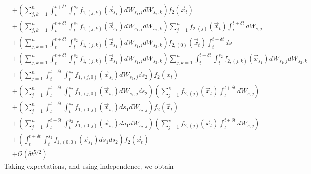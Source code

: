\documentclass[12pt]{article}
\begin{document}
\begin{equation}
\begin{aligned}
&+\left( \sum_{j, k=1}^n \int_t^{t+\delta t} \int_t^{s_2} f_{1,(j,k)}(\vec{x}_{s_1}) dW_{s_1, j} dW_{s_2, k} \right) f_2(\vec{x}_t) \\
&+  \left( \sum_{j, k=1}^n \int_t^{t+\delta t} \int_t^{s_2} f_{1,(j,k)}(\vec{x}_{s_1}) dW_{s_1, j} dW_{s_2, k} \right) \sum_{j=1}^n f_{2,(j)}(\vec{x}_t) \int_t^{t + \delta t} dW_{s,j} \\
&+ \left( \sum_{j, k=1}^n \int_t^{t+\delta t} \int_t^{s_2} f_{1,(j,k)}(\vec{x}_{s_1}) dW_{s_1, j} dW_{s_2, k} \right) f_{2,(0)}(\vec{x}_t) \int_t^{t + \delta t} ds \\
&+ \left( \sum_{j, k=1}^n \int_t^{t+\delta t} \int_t^{s_2} f_{1,(j,k)}(\vec{x}_{s_1}) dW_{s_1, j} dW_{s_2, k} \right)\sum_{j, k=1}^n \int_t^{t+\delta t} \int_t^{s_2} f_{2,(j,k)}(\vec{x}_{s_1}) dW_{s_1, j} dW_{s_2, k} \\
&+ \left( \sum_{j=1}^n \int_t^{t+\delta t} \int_t^{s_2} f_{1,(j,0)}(\vec{x}_{s_1}) dW_{s_1, j} ds_2  \right) f_2(\vec{x}_t) \\
&+  \left( \sum_{j=1}^n \int_t^{t+\delta t} \int_t^{s_2} f_{1,(j,0)}(\vec{x}_{s_1}) dW_{s_1, j} ds_2  \right)\left( \sum_{j=1}^n f_{2,(j)}(\vec{x}_t) \int_t^{t + \delta t} dW_{s,j} \right)\\
&+ \left( \sum_{j=1}^n \int_t^{t+\delta t} \int_t^{s_2} f_{1,(0,j)}(\vec{x}_{s_1}) ds_1 dW_{s_2, j}  \right) f_2(\vec{x}_t) \\
&+  \left( \sum_{j=1}^n \int_t^{t+\delta t} \int_t^{s_2} f_{1,(0,j)}(\vec{x}_{s_1}) ds_1 dW_{s_2, j}  \right)\left( \sum_{j=1}^n f_{2,(j)}(\vec{x}_t) \int_t^{t + \delta t} dW_{s,j} \right) \\
&+ \left( \int_t^{t+\delta t} \int_t^{s_2} f_{1,(0,0)}(\vec{x}_{s_1}) ds_1 ds_2 \right) f_2(\vec{x}_t) \\
&+ \mathcal{O} (\delta t^{5/2})
\end{aligned}
\end{equation}
%
Taking expectations, and using independence, we obtain
%
\end{document}
